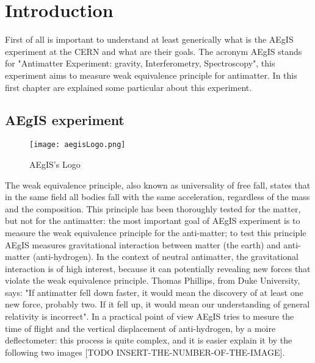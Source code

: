 
\chapter{Introduction} %

\label{Chapter1} %


First of all is important to understand at least generically what is the AEgIS experiment at the CERN and what are their goals. The acronym AEgIS stands for "Antimatter Experiment: gravity, Interferometry, Spectroscopy", this experiment aims to measure weak equivalence principle for antimatter. In this first chapter are explained some particular about this experiment.  

\section{AEgIS experiment}


\begin{figure}[H]
\centering
\texttt{[image: aegisLogo.png]} 
\caption{AEgIS's Logo}
\end{figure}

The weak equivalence principle, also known as universality of free fall, states that in the same field all bodies fall with the same acceleration, regardless of the mass and the composition. This principle has been thoroughly tested for the matter, but not for the antimatter: the most important goal of AEgIS experiment is to measure the weak equivalence principle for the anti-matter; to test this principle AEgIS measures gravitational interaction between matter (the earth) and anti-matter (anti-hydrogen). In the context of neutral antimatter, the gravitational interaction is of high interest, because it can potentially revealing new forces that violate the weak equivalence principle. Thomas Phillips, from Duke University, says: "If antimatter fell down faster, it would mean the discovery of at least one new force, probably two. If it fell up, it would mean our understanding of general relativity is incorrect". In a practical point of view AEgIS tries to mesure the time of flight and the vertical displacement of anti-hydrogen, by a moire deflectometer: this process is quite complex, and it is easier explain it by the following two images [TODO INSERT-THE-NUMBER-OF-THE-IMAGE].

